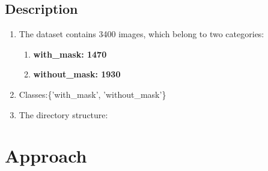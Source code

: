 \documentclass{article}
\begin{document}
  \subsection{Description}
  \begin{enumerate}
    \item The dataset contains 3400 images, which belong to two categories:
          \begin{enumerate}
            \item \textbf{with\_mask: 1470}
            \item \textbf{without\_mask: 1930}
          \end{enumerate}

    \item Classes:\{'with\_mask', 'without\_mask'\}
    
    \item The directory structure:
          \DTsetlength{0.2em}{1em}{0.2em}{1pt}{3pt}
  \end{enumerate}


\section{Approach}
\end{document}
